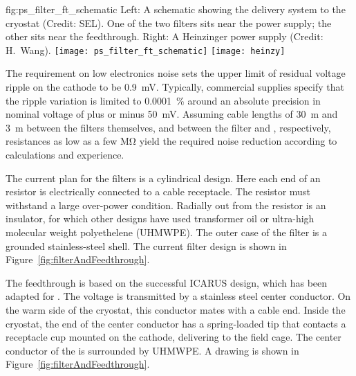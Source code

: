 \begin{dunefigure}{fig:ps_filter_ft_schematic}
{Left:  A schematic showing the  delivery system to the cryostat (Credit:  SEL).%
One of the two filters sits near the power supply; the other sits near the feedthrough. Right:  %
A Heinzinger power supply (Credit: H.~Wang).}
\texttt{[image: ps\_filter\_ft\_schematic]}
\texttt{[image: heinzy]}
\end{dunefigure}
The requirement %
on low electronics noise sets the upper limit of residual voltage ripple on the cathode to be \SI{0.9}{mV}.  Typically, commercial supplies %
specify  that the ripple variation is limited to %
\SI{.0001}{\%} around an absolute precision in nominal voltage of plus or minus \SI{50}{mV}.
%
Assuming cable lengths of \SI{30}{m} and \SI{3}{m} between the filters themselves, and between the filter and \fdth, respectively, resistances as low as a few \si{\mega\ohm} yield the required noise reduction according to calculations and experience. %

The current plan for the filters is a cylindrical design.  %
Here each end of an  resistor is electrically connected to a cable receptacle. 
The resistor %
must withstand a large over-power condition.  Radially out from the resistor is an insulator,  %
for which other designs have used transformer oil or ultra-high molecular weight polyethelene (UHMWPE).  The outer case of the filter is a grounded stainless-steel shell. The current filter design is shown in Figure~\ref{fig:filterAndFeedthrough}.

The  feedthrough %
is based on the successful ICARUS design,  which has been adapted for .  The voltage is transmitted by a stainless steel center conductor.  On the warm side of the cryostat, this conductor mates with a cable end.  Inside the cryostat, the end of the center conductor has a spring-loaded tip that %
contacts a receptacle cup mounted on the cathode, delivering  to the field cage.  The center conductor of the \fdth is surrounded by UHMWPE. A drawing is shown in Figure~\ref{fig:filterAndFeedthrough}.

